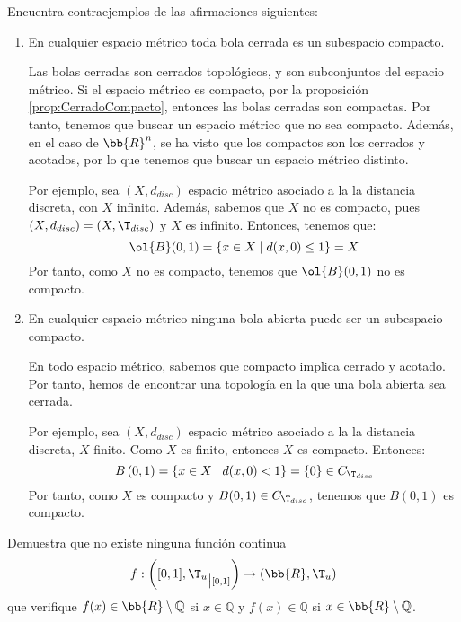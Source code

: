 \begin{ejercicio}
    Encuentra contraejemplos de las afirmaciones siguientes:
    \begin{enumerate}
        \item En cualquier espacio métrico toda bola cerrada es un subespacio compacto.
        
        Las bolas cerradas son cerrados topológicos,  y son subconjuntos del espacio métrico. Si el espacio métrico es compacto, por la proposición \ref{prop:CerradoCompacto}, entonces las bolas cerradas son compactas.
        Por tanto, tenemos que buscar un espacio métrico que no sea compacto. Además, en el caso de $\bb{R}^n$, se ha visto que los compactos son los cerrados y acotados, por lo que tenemos que buscar un espacio métrico distinto.

        Por ejemplo, sea $(X,d_{disc})$ espacio métrico asociado a la la distancia discreta, con $X$ infinito. Además, sabemos que $X$ no es compacto, pues $(X,d_{disc})=(X,\T_{disc})$ y $X$ es infinito.
        Entonces, tenemos que:
        \begin{equation*}
            \ol{B}(0,1) = \{x\in X \mid d(x,0)\leq 1\} = X
        \end{equation*}
        Por tanto, como $X$ no es compacto, tenemos que $\ol{B}(0,1)$ no es compacto.

        \item En cualquier espacio métrico ninguna bola abierta puede ser un subespacio compacto.
        
        En todo espacio métrico, sabemos que compacto implica cerrado y acotado. Por tanto, hemos de encontrar una topología en la que una bola abierta sea cerrada.
        
        Por ejemplo, sea $(X,d_{disc})$ espacio métrico asociado a la la distancia discreta, $X$ finito. Como $X$ es finito, entonces $X$ es compacto. Entonces:
        \begin{equation*}
            B\left(0, 1\right) = \{x\in X \mid d(x,0)< 1\} = \{0\} \in C_{\T_{disc}}
        \end{equation*}
        Por tanto, como $X$ es compacto y $B(0,1)\in C_{\T_{disc}}$, tenemos que $B(0,1)$ es compacto.
    \end{enumerate}
\end{ejercicio}

\begin{ejercicio}
    Demuestra que no existe ninguna función continua \[f: \left([0, 1], {\T_u}_{\big| [0,1]}\right) \to (\bb{R}, \T_u)\] que verifique $f(x) \in \bb{R} \setminus \mathbb{Q}$ si $x \in \mathbb{Q}$ y $f(x) \in \mathbb{Q}$ si $x \in \bb{R} \setminus \mathbb{Q}$.
\end{ejercicio}

